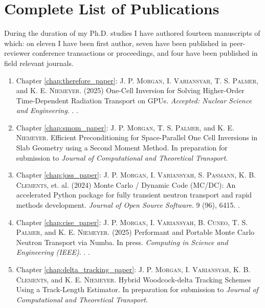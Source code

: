 \chapter{Complete List of Publications}
\label{chap:listopusb}

During the duration of my Ph.D. studies I have authored fourteen manuscripts of which: on eleven I have been first author, seven have been published in peer-reviewer conference transactions or proceedings, and four have been published in field relevant journals.

\begin{enumerate}
    \item Chapter \ref{chap:therefore_paper}: \textsc{J. P. Morgan}, \textsc{I. Variansyah}, \textsc{T. S. Palmer}, and \textsc{K. E. Niemeyer}. (2025) One-Cell Inversion for Solving Higher-Order Time-Dependent Radiation Transport on GPUs. \emph{Accepted: Nuclear Science and Engineering}. . .

    \item Chapter \ref{chap:smom_paper}: \textsc{J. P. Morgan},  \textsc{T. S. Palmer}, and \textsc{K. E. Niemeyer}. Efficient Preconditioning for Space-Parallel One Cell Inversions in Slab Geometry using a Second Moment Method. In preparation for submission to \emph{Journal of Computational and Theoretical Transport}.

    \item Chapter \ref{chap:joss_paper}: \textsc{J. P. Morgan}, \textsc{I. Variansyah}, \textsc{S. Pasmann}, \textsc{K. B. Clements}, et. al. (2024) Monte Carlo / Dynamic Code (MC/DC): An accelerated Python package for fully transient neutron transport and rapid methods development. \emph{Journal of Open Source Software}. 9 (96), 6415. .

    \item Chapter \ref{chap:cise_paper}: \textsc{J. P. Morgan}, \textsc{I. Variansyah}, \textsc{B. Cuneo}, \textsc{T. S. Palmer}, and \textsc{K. E. Niemeyer}. (2025) Performant and Portable Monte Carlo Neutron Transport via Numba. In press. \emph{Computing in Science and Engineering (IEEE)}. . .

    \item Chapter \ref{chap:delta_tracking_paper}: \textsc{J. P. Morgan}, \textsc{I. Variansyah}, \textsc{K. B. Clements}, and \textsc{K. E. Niemeyer}. Hybrid Woodcock-delta Tracking Schemes Using a Track-Length Estimator. In preparation for submission to \emph{Journal of Computational and Theoretical Transport}.


\end{enumerate}
